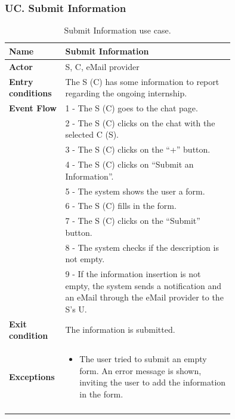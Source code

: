 \subsubsection*{UC\cuc . Submit Information}
\begin{center}
    \begin{longtable}{|l|p{0.75\linewidth}|}
        \hline
        \textbf{Name}               & Submit Information\\
        \hline
        \textbf{Actor}              & S, C, eMail provider\\
        \hline
        \textbf{Entry conditions}   & The S (C) has some information to report regarding the ongoing internship.\\
        \hline
        \textbf{Event Flow}         & 1 - The S (C) goes to the chat page. \\
        & 2 - The S (C) clicks on the chat with the selected C (S). \\
        & 3 - The S (C) clicks on the “+” button. \\
        & 4 - The S (C) clicks on “Submit an Information”. \\
        & 5 - The system shows the user a form. \\
        & 6 - The S (C) fills in the form. \\
        & 7 - The S (C) clicks on the “Submit” button. \\
        & 8 - The system checks if the description is not empty. \\
        & 9 - If the information insertion is not empty, the system sends a notification and an eMail through the eMail provider to the S’s U. \\
        \hline
        \textbf{Exit condition}   & The information is submitted. \\       
        \hline
        \textbf{Exceptions}       & \begin{itemize}
            \item The user tried to submit an empty form. An error message is shown, inviting the user to add the information in the form.
        \end{itemize}\\
        \hline
        \caption{Submit Information use case.}
        \label{tab: submit_information_use_case}
    \end{longtable}
\end{center}



